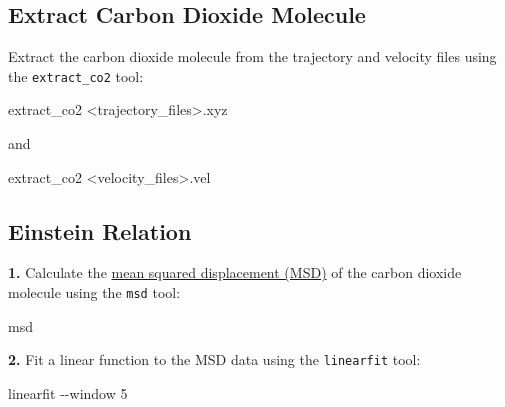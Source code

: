 \documentclass[
  letterpaper,
]{article}
\newenvironment{Shaded}{\begin{snugshade}}{\end{snugshade}}
\newcommand{\AttributeTok}[1]{\textcolor[rgb]{0.40,0.45,0.13}{#1}}
\newcommand{\ExtensionTok}[1]{\textcolor[rgb]{0.00,0.23,0.31}{#1}}
\newcommand{\NormalTok}[1]{\textcolor[rgb]{0.00,0.23,0.31}{#1}}
\newcommand{\OperatorTok}[1]{\textcolor[rgb]{0.37,0.37,0.37}{#1}}
\begin{document}
\hypertarget{extract-carbon-dioxide-molecule}{%
\subsection*{Extract Carbon Dioxide
Molecule}\label{extract-carbon-dioxide-molecule}}


Extract the carbon dioxide molecule from the trajectory and velocity
files using the \texttt{extract\_co2} tool:

\begin{Shaded}
\begin{Highlighting}[]
\ExtensionTok{extract\_co2} \OperatorTok{\textless{}}\NormalTok{trajectory\_files}\OperatorTok{\textgreater{}}\NormalTok{.xyz}
\end{Highlighting}
\end{Shaded}

and

\begin{Shaded}
\begin{Highlighting}[]
\ExtensionTok{extract\_co2} \OperatorTok{\textless{}}\NormalTok{velocity\_files}\OperatorTok{\textgreater{}}\NormalTok{.vel}
\end{Highlighting}
\end{Shaded}

\hypertarget{einstein-relation}{%
\subsection*{Einstein Relation}\label{einstein-relation}}


\textbf{1.} Calculate the \protect\hyperlink{einstein-relation}{mean
squared displacement (MSD)} of the carbon dioxide molecule using the
\texttt{msd} tool:

\begin{Shaded}
\begin{Highlighting}[]
\ExtensionTok{msd}
\end{Highlighting}
\end{Shaded}

\textbf{2.} Fit a linear function to the MSD data using the
\texttt{linearfit} tool:

\begin{Shaded}
\begin{Highlighting}[]
\ExtensionTok{linearfit} \AttributeTok{{-}{-}window}\NormalTok{ 5}
\end{Highlighting}
\end{Shaded}
\end{document}
